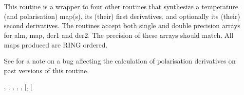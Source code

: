 \sloppy
{}\section[alm2map\_der*]{ }
\label{sub:alm2map_der}
\author{Eric Hivon}

\begin{facility}
{This routine is a wrapper to four other routines that synthesize a \healpix
  temperature (and polarisation) map(s), its (their) first derivatives, and optionally
  its (their) second derivatives.
The routines accept both single and double precision arrays for alm, map, der1 and
der2. The precision of these arrays should match. All maps produced are RING
ordered.

See   for a note on a bug
affecting the calculation of polarisation derivatives on past versions of this routine.
}
{\modAlmTools}
\end{facility}

\begin{f90format}
{%
, %
, %
, %
, %
, %
 [, %
]}
\end{f90format}

